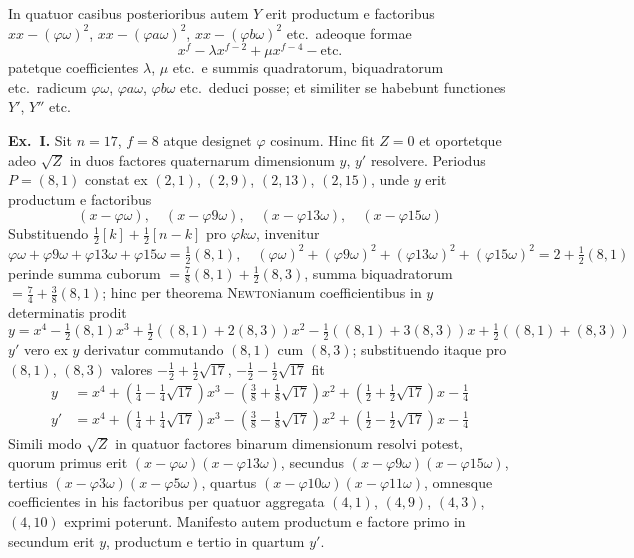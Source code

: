 \documentclass[12pt,a4paper]{article}
\theoremstyle{plain}
\theoremstyle{definition}
\theoremstyle{remark}
\begin{document}
In quatuor casibus posterioribus autem $Y$ erit productum e factoribus $xx - (\varphi\omega)^2$, $xx - (\varphi a\omega)^2$, $xx - (\varphi b\omega)^2$ etc.\ adeoque formae
\[x^f - \lambda x^{f-2} + \mu x^{f-4} - \text{etc.}\]
patetque coefficientes $\lambda$, $\mu$ etc.\ e summis quadratorum, biquadratorum etc.\ radicum $\varphi\omega$, $\varphi a\omega$, $\varphi b\omega$ etc.\ deduci posse; et similiter se habebunt functiones $Y'$, $Y''$ etc.

\textbf{Ex.\ I.} Sit $n = 17$, $f = 8$ atque designet $\varphi$ cosinum. Hinc fit $Z = 0$ et oportetque adeo $\sqrt{Z}$ in duos factores quaternarum dimensionum $y$, $y'$ resolvere. Periodus $P = (8,1)$ constat ex $(2,1)$, $(2,9)$, $(2,13)$, $(2,15)$, unde $y$ erit productum e factoribus
\[(x - \varphi\omega), \quad (x - \varphi9\omega), \quad (x - \varphi13\omega), \quad (x - \varphi15\omega)\]
Substituendo $\tfrac{1}{2}[k] + \tfrac{1}{2}[n-k]$ pro $\varphi k\omega$, invenitur
\[\varphi\omega + \varphi9\omega + \varphi13\omega + \varphi15\omega = \tfrac{1}{2}(8,1), \quad (\varphi\omega)^2 + (\varphi9\omega)^2 + (\varphi13\omega)^2 + (\varphi15\omega)^2 = 2 + \tfrac{1}{2}(8,1)\]
perinde summa cuborum $= \tfrac{7}{8}(8,1) + \tfrac{1}{2}(8,3)$, summa biquadratorum $= \tfrac{7}{4} + \tfrac{3}{8}(8,1)$; hinc per theorema \textsc{Newton}ianum coefficientibus in $y$ determinatis prodit
\[y = x^4 - \tfrac{1}{2}(8,1)x^3 + \tfrac{1}{2}((8,1) + 2(8,3))x^2 - \tfrac{1}{2}((8,1) + 3(8,3))x + \tfrac{1}{2}((8,1) + (8,3))\]
$y'$ vero ex $y$ derivatur commutando $(8,1)$ cum $(8,3)$; substituendo itaque pro $(8,1)$, $(8,3)$ valores $-\tfrac{1}{2} + \tfrac{1}{2}\sqrt{17}$, $-\tfrac{1}{2} - \tfrac{1}{2}\sqrt{17}$ fit
\begin{align*}
y &= x^4 + (\tfrac{1}{4} - \tfrac{1}{4}\sqrt{17})x^3 - (\tfrac{3}{8} + \tfrac{1}{8}\sqrt{17})x^2 + (\tfrac{1}{2} + \tfrac{1}{2}\sqrt{17})x - \tfrac{1}{4} \\
y' &= x^4 + (\tfrac{1}{4} + \tfrac{1}{4}\sqrt{17})x^3 - (\tfrac{3}{8} - \tfrac{1}{8}\sqrt{17})x^2 + (\tfrac{1}{2} - \tfrac{1}{2}\sqrt{17})x - \tfrac{1}{4}
\end{align*}
Simili modo $\sqrt{Z}$ in quatuor factores binarum dimensionum resolvi potest, quorum primus erit $(x - \varphi\omega)(x - \varphi13\omega)$, secundus $(x - \varphi9\omega)(x - \varphi15\omega)$, tertius $(x - \varphi3\omega)(x - \varphi5\omega)$, quartus $(x - \varphi10\omega)(x - \varphi11\omega)$, omnesque coefficientes in his factoribus per quatuor aggregata $(4,1)$, $(4,9)$, $(4,3)$, $(4,10)$ exprimi poterunt. Manifesto autem productum e factore primo in secundum erit $y$, productum e tertio in quartum $y'$.
\end{document}
